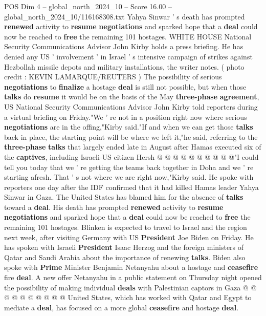 \begin{textsample}{POS Dim 4 – global\_north\_2024\_10 – Score 16.00 – global\_north\_2024\_10/116168308.txt}  \label{ex:f4_pos_409}
Yahya Sinwar ' s death has prompted \textbf{renewed} activity to \textbf{resume} \textbf{negotiations} and sparked hope that a \textbf{deal} could now be reached to \textbf{free} the remaining 101 hostages.
WHITE HOUSE National Security Communications Advisor John Kirby holds a press briefing.
He has denied any US ' involvement ' in Israel ' s intensive campaign of strikes against Hezbollah missile depots and military installations, the writer notes. ( photo credit : KEVIN LAMARQUE/REUTERS ) The possibility of serious \textbf{negotiations} to \textbf{finalize} a hostage \textbf{deal} is still not possible, but when those \textbf{talks} do \textbf{resume} it would be on the basis of the May \textbf{three-phase} \textbf{agreement}, US National Security Communications Advisor John Kirby told reporters during a virtual briefing on Friday."We ' re not in a position right now where serious \textbf{negotiations} are in the offing,"Kirby said."If and when we can get those \textbf{talks} back in place, the starting point will be where we left it,"he said, referring to the \textbf{three-phase} \textbf{talks} that largely ended late in August after Hamas executed six of the \textbf{captives}, including Israeli-US citizen Hersh @ @ @ @ @ @ @ @ @ @"I could tell you today that we ' re getting the teams back together in Doha and we ' re starting afresh.
That ' s not where we are right now,"Kirby said.
He spoke with reporters one day after the IDF confirmed that it had killed Hamas leader Yahya Sinwar in Gaza.
The United States has blamed him for the absence of \textbf{talks} toward a \textbf{deal}.
His death has prompted \textbf{renewed} activity to \textbf{resume} \textbf{negotiations} and sparked hope that a \textbf{deal} could now be reached to \textbf{free} the remaining 101 hostages.
Blinken is expected to travel to Israel and the region next week, after visiting Germany with US \textbf{President} Joe Biden on Friday.
He has spoken with Israeli \textbf{President} Isaac Herzog and the foreign ministers of Qatar and Saudi Arabia about the importance of renewing \textbf{talks}.
Biden also spoke with \textbf{Prime} Minister Benjamin Netanyahu about a hostage and \textbf{ceasefire} fire \textbf{deal}.
A new offer Netanyahu in a public statement on Thursday night opened the possibility of making individual \textbf{deals} with Palestinian captors in Gaza @ @ @ @ @ @ @ @ @ @ United States, which has worked with Qatar and Egypt to mediate a \textbf{deal}, has focused on a more global \textbf{ceasefire} and hostage \textbf{deal}.

\end{textsample}
